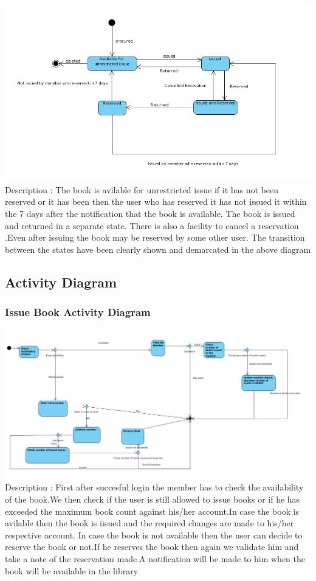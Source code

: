 \documentclass[a4paper]{article}
\begin{document}
\includegraphics[scale=0.50]{images/stateDiagIssue.png}
\\
Description : The book is avilable for unrestricted issue if it has not been reserved or it has been then the user who has reserved it has not issued it within the 7 days after the notification that the book is available. The book is issued and returned in a separate state. There is also a facility to cancel a reservation .Even after issuing the book may be reserved by some other user. The transition between the states have been clearly shown and demarcated in the above diagram


\subsection{Activity Diagram}
\subsubsection*{Issue Book Activity Diagram}
\includegraphics[scale=0.50]{images/activityDiagIssue.png}
\\
Description : First after succesful login the member has to check the availability of the book.We then check if the user is still allowed to issue books or if he has exceeded the maximum book count against his/her account.In case the book is avilable then the book is iisued and the required changes are made to his/her respective account. In case the book is not available then the user can decide to reserve the book or not.If he reserves the book then again we validate him and take a note of the reservation made.A notification will be made to him when the book will be available in the library
\end{document}
